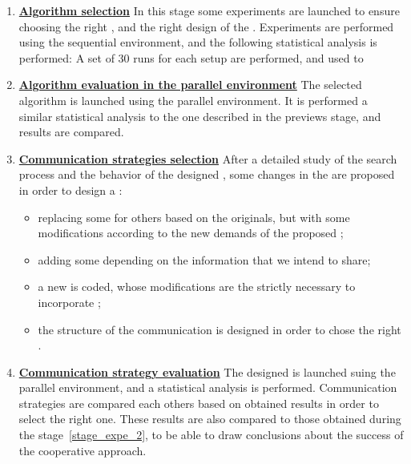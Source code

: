 \begin{enumerate}
\item \underline{\textbf{Algorithm selection}} In this stage some experiments are launched to ensure choosing the right \oms, and the right design of the \as. Experiments are performed using the sequential environment, and the following statistical analysis is performed: A set of 30 runs for each setup are performed, and used to 

\item \underline{\textbf{Algorithm evaluation in the parallel environment}} The selected algorithm is launched using the parallel environment. It is performed a similar statistical analysis to the one described in the previews stage, and results are compared.\label{stage_expe_2}

\item \underline{\textbf{Communication strategies selection}} After a detailed study of the search process and the behavior of the designed \sosets, some changes in the \soset{} are proposed in order to design a \commstr:
\begin{itemize}
\item replacing some \oms{} for others based on the originals, but with some modifications according to the new demands of the proposed \commstr;
\item adding some \opchs{} depending on the information that we intend to share;
\item a new \as{} is coded, whose modifications are the strictly necessary to incorporate \opchs;
\item the structure of the communication is designed in order to chose the right \commopers.
\end{itemize}

\item \underline{\textbf{Communication strategy evaluation}} The designed \commstr{} is launched suing the parallel environment, and a statistical analysis is performed. Communication strategies are compared each others based on obtained results in order to select the right one. These results are also compared to those obtained during the stage~\ref{stage_expe_2}, to be able to draw conclusions about the success of the cooperative approach.
\end{enumerate}

